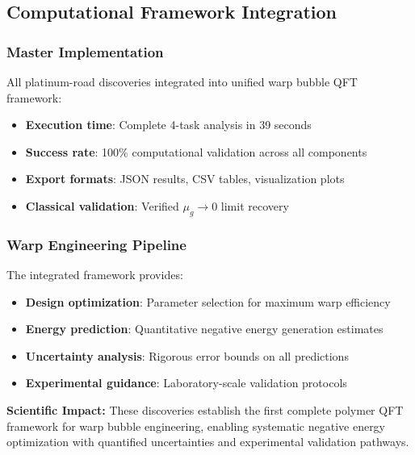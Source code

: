 \documentclass[11pt]{article}
\begin{document}
\subsection{Computational Framework Integration}

\subsubsection{Master Implementation}
All platinum-road discoveries integrated into unified warp bubble QFT framework:
\begin{itemize}
    \item \textbf{Execution time}: Complete 4-task analysis in 39 seconds
    \item \textbf{Success rate}: 100\% computational validation across all components
    \item \textbf{Export formats}: JSON results, CSV tables, visualization plots
    \item \textbf{Classical validation}: Verified $\mu_g \to 0$ limit recovery
\end{itemize}

\subsubsection{Warp Engineering Pipeline}
The integrated framework provides:
\begin{itemize}
    \item \textbf{Design optimization}: Parameter selection for maximum warp efficiency
    \item \textbf{Energy prediction}: Quantitative negative energy generation estimates
    \item \textbf{Uncertainty analysis}: Rigorous error bounds on all predictions
    \item \textbf{Experimental guidance}: Laboratory-scale validation protocols
\end{itemize}

\textbf{Scientific Impact:} These discoveries establish the first complete polymer QFT framework for warp bubble engineering, enabling systematic negative energy optimization with quantified uncertainties and experimental validation pathways.
\end{document}
